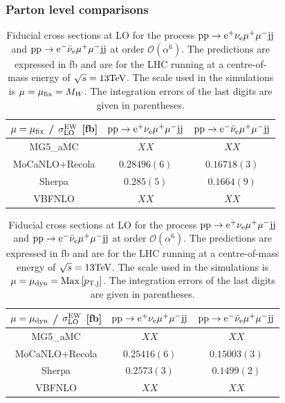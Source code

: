 \subsubsection*{Parton level comparisons}

\begin{table}
\begin{center} 
\begin{tabular}{ c | c | c }
 $\mu = \mu_{\rm fix}$ / $\sigma_{\rm LO}^{\rm EW}$ [fb] & ${\rm p} {\rm p} \to {\rm e}^+  \nu_{\rm e}  \mu^+ \mu^- {\rm j} {\rm j}$  & ${\rm p} {\rm p} \to {\rm e}^-  \bar \nu_{\rm e}  \mu^+ \mu^- {\rm j} {\rm j}$  \\
  \hline\hline
{\sc MG5\_aMC}        & $XX$  & $XX$   \\
  {\sc MoCaNLO}+{\sc Recola}             & $0.28496(6)$  & $0.16718(3)$  \\
{\sc Sherpa}        & $0.285(5)$  & $0.1664(9)$   \\
{\sc VBFNLO}        & $XX$  & $XX$   \\
  \hline
\end{tabular}
\end{center}
\caption{
Fiducial cross sections at LO for the process ${\rm p}{\rm p}\to{\rm e}^+\nu_{\rm e}\mu^+\mu^-{\rm j}{\rm j}$ and ${\rm p}{\rm p}\to{\rm e}^-\bar\nu_{\rm e}\mu^+\mu^-{\rm j}{\rm j}$ at order $\mathcal{O} (\alpha^6)$.
The predictions are expressed in fb and are for the LHC running at a centre-of-mass energy of $\sqrt{s}=13 {\rm TeV}$.
The scale used in the simulations is $\mu = \mu_{\rm fix} = M_W$.
The integration errors of the last digits are given in parentheses.}
\label{table:xsectLOfix}
\end{table}

\begin{table}
\begin{center} 
\begin{tabular}{ c | c | c }
 $\mu = \mu_{\rm dyn}$ / $\sigma_{\rm LO}^{\rm EW}$ [fb] & ${\rm p} {\rm p} \to {\rm e}^+  \nu_{\rm e}  \mu^+ \mu^- {\rm j} {\rm j}$  & ${\rm p} {\rm p} \to {\rm e}^-  \bar \nu_{\rm e}  \mu^+ \mu^- {\rm j} {\rm j}$  \\
  \hline\hline
{\sc MG5\_aMC}        & $XX$  & $XX$   \\
  {\sc MoCaNLO}+{\sc Recola}             & $0.25416(6)$  & $0.15003(3)$  \\
{\sc Sherpa}        & $0.2573(3)$  & $0.1499(2)$   \\
{\sc VBFNLO}        & $XX$  & $XX$   \\
  \hline
\end{tabular}
\end{center}
\caption{
Fiducial cross sections at LO for the process ${\rm p}{\rm p}\to{\rm e}^+\nu_{\rm e}\mu^+\mu^-{\rm j}{\rm j}$ and ${\rm p}{\rm p}\to{\rm e}^-\bar\nu_{\rm e}\mu^+\mu^-{\rm j}{\rm j}$ at order $\mathcal{O} (\alpha^6)$.
The predictions are expressed in fb and are for the LHC running at a centre-of-mass energy of $\sqrt{s}=13 {\rm TeV}$.
The scale used in the simulations is $\mu = \mu_{\rm dyn} = {\rm Max}\left[p_{\rm T, j}\right]$.
The integration errors of the last digits are given in parentheses.}
\label{table:xsectLOdyn}
\end{table}

